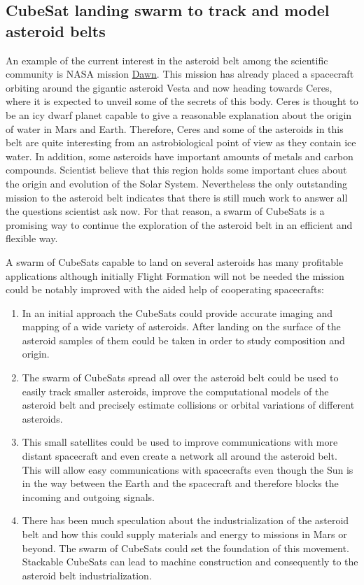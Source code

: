 \subsection{CubeSat landing swarm to track and model asteroid belts}

An example of the current interest in the asteroid belt among the
scientific community is NASA mission \href{http://dawn.jpl.nasa.gov/mission/journal.asp}{Dawn}.
This mission has already placed a spacecraft orbiting around the gigantic
asteroid Vesta and now heading towards Ceres, where it is expected
to unveil some of the secrets of this body. Ceres is thought to be
an icy dwarf planet capable to give a reasonable explanation about
the origin of water in Mars and Earth. Therefore, Ceres and some of
the asteroids in this belt are quite interesting from an astrobiological
point of view as they contain ice water. In addition, some asteroids
have important amounts of metals and carbon compounds. Scientist believe
that this region holds some important clues about the origin and evolution
of the Solar System. Nevertheless the only outstanding mission to
the asteroid belt indicates that there is still much work to answer
all the questions scientist ask now. For that reason, a swarm of CubeSats
is a promising way to continue the exploration of the asteroid belt
in an efficient and flexible way.

A swarm of CubeSats capable to land on several asteroids has many
profitable applications although initially Flight Formation will not
be needed the mission could be notably improved with the aided help
of cooperating spacecrafts:
\begin{enumerate}
\item In an initial approach the CubeSats could provide accurate imaging
and mapping of a wide variety of asteroids. After landing on the surface
of the asteroid samples of them could be taken in order to study composition
and origin.
\item The swarm of CubeSats spread all over the asteroid belt could be used
to easily track smaller asteroids, improve the computational models
of the asteroid belt and precisely estimate collisions or orbital
variations of different asteroids.
\item This small satellites could be used to improve communications with
more distant spacecraft and even create a network all around the asteroid
belt. This will allow easy communications with spacecrafts even though
the Sun is in the way between the Earth and the spacecraft and therefore
blocks the incoming and outgoing signals.
\item There has been much speculation about the industrialization of the
asteroid belt and how this could supply materials and energy to missions
in Mars or beyond. The swarm of CubeSats could set the foundation
of this movement. Stackable CubeSats can lead to machine construction
and consequently to the asteroid belt industrialization.
\end{enumerate}

